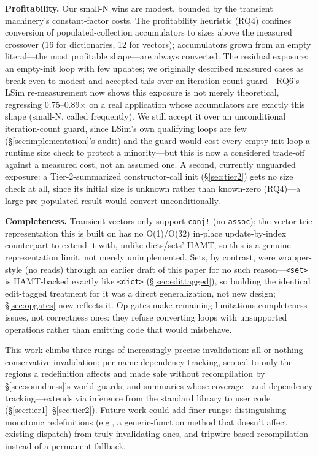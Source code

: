 \documentclass[sigplan,review,anonymous]{acmart}
\begin{document}
\textbf{Profitability.} Our small-N wins are modest, bounded by the transient machinery's constant-factor costs. The profitability heuristic (RQ4) confines conversion of populated-collection accumulators to sizes above the measured crossover (16 for dictionaries, 12 for vectors); accumulators grown from an empty literal---the most profitable shape---are always converted. The residual exposure: an empty-init loop with few updates; we originally described measured cases as break-even to modest and accepted this over an iteration-count guard---RQ6's LSim re-measurement now shows this exposure is not merely theoretical, regressing 0.75--0.89$\times$ on a real application whose accumulators are exactly this shape (small-N, called frequently). We still accept it over an unconditional iteration-count guard, since LSim's own qualifying loops are few (§\ref{sec:implementation}'s audit) and the guard would cost every empty-init loop a runtime size check to protect a minority---but this is now a considered trade-off against a measured cost, not an assumed one. A second, currently unguarded exposure: a Tier-2-summarized constructor-call init (§\ref{sec:tier2}) gets no size check at all, since its initial size is unknown rather than known-zero (RQ4)---a large pre-populated result would convert unconditionally.

\textbf{Completeness.} Transient vectors only support \texttt{conj!} (no \texttt{assoc}); the vector-trie representation this is built on has no O(1)/O(32) in-place update-by-index counterpart to extend it with, unlike dicts/sets' HAMT, so this is a genuine representation limit, not merely unimplemented. Sets, by contrast, were wrapper-style (no reads) through an earlier draft of this paper for no such reason---\texttt{<set>} is HAMT-backed exactly like \texttt{<dict>} (§\ref{sec:edittagged}), so building the identical edit-tagged treatment for it was a direct generalization, not new design; §\ref{sec:opgates} now reflects it. Op gates make remaining limitations completeness issues, not correctness ones: they refuse converting loops with unsupported operations rather than emitting code that would misbehave.

This work climbs three rungs of increasingly precise invalidation: all-or-nothing conservative invalidation; per-name dependency tracking, scoped to only the regions a redefinition affects and made safe without recompilation by §\ref{sec:soundness}'s world guards; and summaries whose coverage---and dependency tracking---extends via inference from the standard library to user code (§\ref{sec:tier1}--§\ref{sec:tier2}). Future work could add finer rungs: distinguishing monotonic redefinitions (e.g., a generic-function method that doesn't affect existing dispatch) from truly invalidating ones, and tripwire-based recompilation instead of a permanent fallback.
\end{document}
